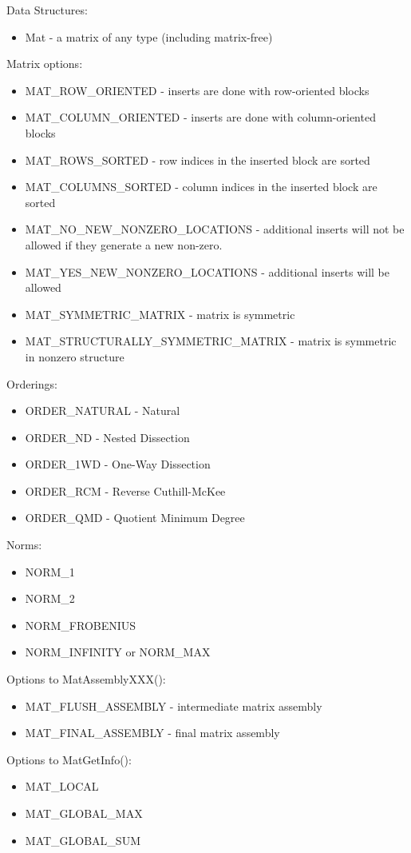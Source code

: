 \noindent
Data Structures: 
\begin{itemize}
\item Mat - a matrix of any type (including matrix-free)
\end{itemize}
Matrix options:
\begin{itemize}
\item MAT\_ROW\_ORIENTED - inserts are done with row-oriented blocks
\item MAT\_COLUMN\_ORIENTED - inserts are done with column-oriented blocks
\item MAT\_ROWS\_SORTED - row indices in the inserted block are sorted
\item MAT\_COLUMNS\_SORTED - column indices in the inserted block are sorted
\item MAT\_NO\_NEW\_NONZERO\_LOCATIONS - additional inserts will not be allowed if they
      generate a new non-zero.
\item MAT\_YES\_NEW\_NONZERO\_LOCATIONS - additional inserts will be allowed
\item MAT\_SYMMETRIC\_MATRIX - matrix is symmetric
\item MAT\_STRUCTURALLY\_SYMMETRIC\_MATRIX - matrix is symmetric in nonzero structure
\end{itemize}
Orderings:
\begin{itemize}
\item ORDER\_NATURAL - Natural
\item ORDER\_ND - Nested Dissection
\item ORDER\_1WD - One-Way Dissection 
\item ORDER\_RCM - Reverse Cuthill-McKee
\item ORDER\_QMD - Quotient Minimum Degree
\end{itemize}
Norms:
\begin{itemize}
\item NORM\_1
\item NORM\_2
\item NORM\_FROBENIUS
\item NORM\_INFINITY or NORM\_MAX  
\end{itemize}
Options to MatAssemblyXXX():
\begin{itemize}
\item MAT\_FLUSH\_ASSEMBLY - intermediate matrix assembly
\item MAT\_FINAL\_ASSEMBLY - final matrix assembly
\end{itemize}
Options to MatGetInfo():
\begin{itemize}
\item MAT\_LOCAL
\item MAT\_GLOBAL\_MAX
\item MAT\_GLOBAL\_SUM
\end{itemize}
